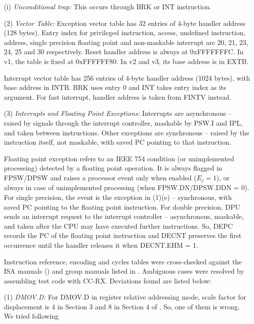     (i) \emph{Unconditional trap:} %
    This occurs through BRK or INT instruction.

\levelone
(2) \emph{Vector Table:} %
Exception vector table has 32 entries of 4-byte handler address (128 bytes). Entry index for 
privileged instruction, access, undefined instruction, address, single precision floating point 
and non-maskable interrupt are 20, 21, 23, 24, 25 and 30 respectively. Reset handler address is 
always at 0xFFFFFFFC. In v1, the table is fixed at 0xFFFFFF80. In v2 and v3, its base address is 
in EXTB.

Interrupt vector table has 256 entries of 4-byte handler address (1024 bytes), with base address 
in INTB. BRK uses entry 0 and INT takes entry index as its argument. For fast interrupt, handler 
address is taken from FINTV instead.

(3) \emph{Interrupts and Floating Point Exceptions:} %
Interrupts are asynchronous -- raised by signals through the interrupt controller, maskable by PSW.I 
and IPL, and taken between instructions. Other exceptions are synchronous -- raised by the instruction 
itself, not maskable, with saved PC pointing to that instruction.

Floating point exception refers to an IEEE 754 condition (or unimplemented processing) detected by a 
floating point operation. It is always flagged in FPSW/DPSW and raises a processor event only when 
enabled ($E_j = 1$), or always in case of unimplemented processing (when FPSW.DN/DPSW.DDN = 0). 
For single precision, the event is the exception in (1)(e) -- synchronous, with saved PC pointing 
to the floating point instruction. For double precision, DPU sends an interrupt request to the 
interrupt controller -- asynchronous, maskable, and taken after the CPU may have executed further 
instructions. So, DEPC records the PC of the floating point instruction and DECNT preserves the 
first occurrence until the handler releases it when DECNT.EHM = 1.



\SOPNoteBody

Instruction reference, encoding and cycles tables were cross-checked against the ISA manuals 
(\cite{rx_v1_um, rx_v2_um, rx_v3_um}) and group manuals listed in . Ambiguous cases were resolved by assembling test code with CC-RX. Deviations found are listed below:

(1) \emph{DMOV.D:} %
For DMOV.D in register relative addressing mode, scale factor for displacement is 4 in Section 3 and 8 
in Section 4 of \cite{rx_v3_um}. So, one of them is wrong. We tried following

